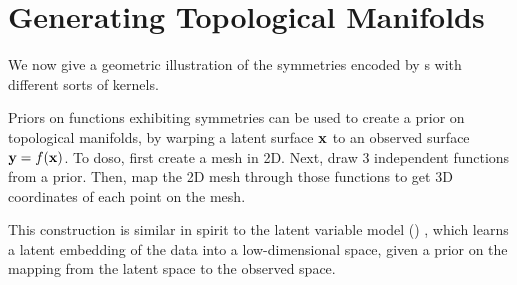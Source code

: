 







\section{Generating Topological Manifolds}

We now give a geometric illustration of the symmetries encoded by \gp{}s with different sorts of kernels.

Priors on functions exhibiting symmetries can be used to create a prior on topological manifolds, by warping a latent surface ${\bf{x}}$ to an observed surface ${\bf{y}} = f({\bf{x}})$.
To doso, first create a mesh in 2D.  Next, draw 3 independent functions from a \gp{} prior.
Then, map the 2D mesh through those functions to get 3D coordinates of each point on the mesh.

This construction is similar in spirit to the \gp{} latent variable model (\gplvm{}) \citep{lawrence2005probabilistic}, which learns a latent embedding of the data into a low-dimensional space, given a \gp{} prior on the mapping from the latent space to the observed space.%

